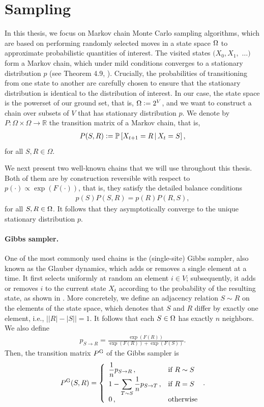 \section{Sampling} \label{sect:sampling}
In this thesis, we focus on Markov chain Monte Carlo sampling algorithms, which are based on performing randomly selected moves in a state space $\ss$ to approximate probabilistic quantities of interest.
The visited states $(X_0, X_1,$ $\ldots)$ form a Markov chain, which under mild conditions converges to a stationary distribution $p$ (see Theorem 4.9, \citealp{levin08book}).
Crucially, the probabilities of transitioning from one state to another are carefully chosen to ensure that the stationary distribution is identical to the distribution of interest.
In our case, the state space is the powerset of our ground set, that is, $\ss \defeq 2^V$, and we want to construct a chain over subsets of $V$ that has stationary distribution $p$.
We denote by $P : \Omega \times \Omega \to \mathbb{R}$ the transition matrix of a Markov chain, that is,
\begin{align*}
P(S, R) \defeq \P\left[ X_{t+1} = R \,|\, X_t = S \right],
\end{align*}
for all $S, R \in \Omega$.

We next present two well-known chains that we will use throughout this thesis.
Both of them are by construction reversible with respect to $p(\cdot) \propto \exp(F(\cdot))$, that is, they satisfy the detailed balance conditions
\begin{align*}
p(S) P(S, R) = p(R) P(R, S),
\end{align*}
for all $S, R \in \ss$.
It follows that they asymptotically converge to the unique stationary distribution $p$.

\paragraph{Gibbs sampler.}
One of the most commonly used chains is the (single-site) Gibbs sampler, also known as the Glauber dynamics, which adds or removes a single element at a time.
It first selects uniformly at random an element $i \in V$; subsequently, it adds or removes $i$ to the current state $X_t$ according to the probability of the resulting state, as shown in .
More concretely, we define an adjacency relation $S \sim R$ on the elements of the state space, which denotes that $S$ and $R$ differ by exactly one element, i.e., $\big||R| - |S|\big| = 1$.
It follows that each $S \in \ss$ has exactly $n$ neighbors.
We also define
\begin{align*}
p_{S \rightarrow R} = \displaystyle\frac{\exp(F(R))}{\exp(F(R)) + \exp(F(S))}.
\end{align*}
Then, the transition matrix $\Pg$ of the Gibbs sampler is
\begin{align*}
  \Pg(S, R) = 
  \threepartdefo{\displaystyle\frac{1}{n}p_{S \rightarrow R}}{R \sim S}{1 - \displaystyle\sum_{T \sim S} \displaystyle\frac{1}{n}p_{S \rightarrow T}}{R = S}{0}.
\end{align*}

